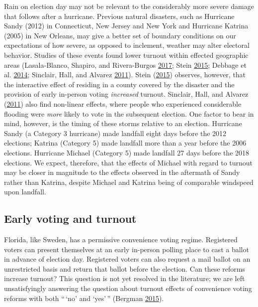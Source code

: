 \documentclass[
  12pt,
]{article}
\begin{document}
Rain on election day may not be relevant to the considerably more severe damage that follows after a hurricane. Previous natural disasters, such as Hurricane Sandy (2012) in Connecticut, New Jersey and New York and Hurricane Katrina (2005) in New Orleans, may give a better set of boundary conditions on our expectations of how severe, as opposed to inclement, weather may alter electoral behavior. Studies of these events found lower turnout within effected geographic areas (Lasala-Blanco, Shapiro, and Rivera-Burgos \protect\hyperlink{ref-Lasala-Blanco2017}{2017}; Stein \protect\hyperlink{ref-Stein2015}{2015}; Debbage et al. \protect\hyperlink{ref-Debbage2014}{2014}; Sinclair, Hall, and Alvarez \protect\hyperlink{ref-Sinclair2011}{2011}). Stein (\protect\hyperlink{ref-Stein2015}{2015}) observes, however, that the interactive effect of residing in a county covered by the disaster and the provision of early in-person voting \emph{increased} turnout. Sinclair, Hall, and Alvarez (\protect\hyperlink{ref-Sinclair2011}{2011}) also find non-linear effects, where people who experienced considerable flooding were \emph{more} likely to vote in the subsequent election. One factor to bear in mind, however, is the timing of these storms relative to an election. Hurricane Sandy (a Category 3 hurricane) made landfall eight days before the 2012 elections; Katrina (Category 5) made landfall more than a year before the 2006 elections. Hurricane Michael (Category 5) made landfall 27 days before the 2018 elections. We expect, therefore, that the effects of Michael with regard to turnout may be closer in magnitude to the effects observed in the aftermath of Sandy rather than Katrina, despite Michael and Katrina being of comparable windspeed upon landfall.

\hypertarget{early-voting-and-turnout}{%
\subsection*{Early voting and turnout}\label{early-voting-and-turnout}}

Florida, like Sweden, has a permissive convenience voting regime. Registered voters can present themselves at an early in-person polling place to cast a ballot in advance of election day. Registered voters can also request a mail ballot on an unrestricted basis and return that ballot before the election. Can these reforms increase turnout? This question is not yet resolved in the literature; we are left unsatisfyingly answering the question about turnout effects of convenience voting reforms with both ``\,`no' and `yes'\,'' (Bergman \protect\hyperlink{ref-Bergman2015}{2015}).
\end{document}
